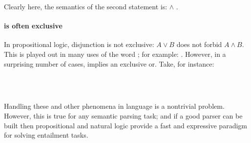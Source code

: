 Clearly here, the semantics of the second statement is: 
   $\land$ .


\paragraph{ is often exclusive}
In propositional logic, disjunction is not exclusive: $A \lor B$ does not
  forbid $A \land B$.
This is played out in many uses of the word ; for example:
  .
However, in a surprising number of cases,  implies an exclusive or.
Take, for instance:

\begin{displayquote}
 \\
 \\
\end{displayquote}

Handling these and other phenomena in language is a nontrivial problem.
However, this is true for any semantic parsing task; and if a good parser can be built
  then propositional and natural logic provide a fast and expressive paradigm for solving
  entailment tasks.


